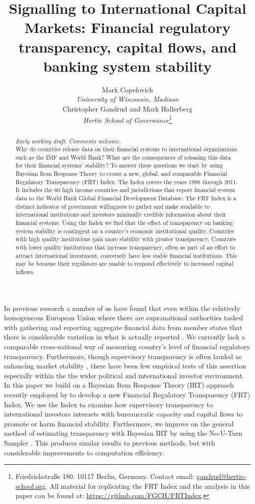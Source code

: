 \documentclass[a4paper]{article}
\title{Signalling to International Capital Markets: Financial regulatory transparency, capital flows, and banking system stability
}
\author{Mark Copelovich \\ \emph{University of Wisconsin, Madison} \\[0.5cm] Christopher Gandrud and Mark Hallerberg \\
    {\emph{Hertie School of Governance}}\footnote{Friedrichstra{\ss}e 180. 10117 Berlin, Germany. Contact email: \href{mailto:gandrud@hertie-school.org}{gandrud@hertie-school.org}. All material for replicating the FRT Index and the analysis in this paper can be found at: \url{https://github.com/FGCH/FRTIndex}.}}
\begin{document}
\maketitle

\begin{abstract}
\noindent \emph{Early working draft. Comments welcome.} \\
    Why do countries release data on their financial systems to international organizations such as the IMF and World Bank? What are the consequences of releasing this data for their financial systems' stability? To answer these questions we start by using Bayesian Item Response Theory to create a new, global, and comparable Financial Regulatory Transparency (FRT) Index. The Index covers the years 1998 through 2011. It includes the 60 high income countries and jurisdictions that report financial system data to the World Bank Global Financial Development Database. The FRT Index is a distinct indicator of government willingness to gather and make available to international institutions and investors minimally credible information about their financial systems. Using the Index we find that the effect of transparency on banking system stability is contingent on a country's economic institutional quality. Countries with high quality institutions gain more stability with greater transparency. Countries with lower quality institutions that increase transparency, often as part of an effort to attract international investment, conversely have less stable financial institutions. This may be because their regulators are unable to respond effectively to increased capital inflows.

\end{abstract}

In previous research a number of us have found that even within the relatively homogeneous European Union where there are supranational authorities tasked with gathering and reporting aggregate financial data from member states that there is considerable variation in what is actually reported \cite[see][]{Gandrud2014a}. We currently lack a comparable cross-national way of measuring country's level of financial regulatory transparency. Furthermore, though supervisory transparency is often lauded as enhancing market stability \cite[see][]{Liedorp2013}, there have been few empirical tests of this assertion especially within the the wider political and international investor environment.  In this paper we build on a Bayesian Item Response Theory (IRT) approach recently employed by \cite{Hollyer2014} to develop a new Financial Regulatory Transparency (FRT) Index. We use the Index to examine how supervisory transparency to international investors interacts with bureaucratic capacity and capital flows to promote or harm financial stability. Furthermore, we improve on the general method of estimating transparency with Bayesian IRT by using the No-U-Turn Sampler \cite{hoffmangelman2013}. This produces similar results to previous methods, but with considerable improvements to computation efficiency.
\end{document}

